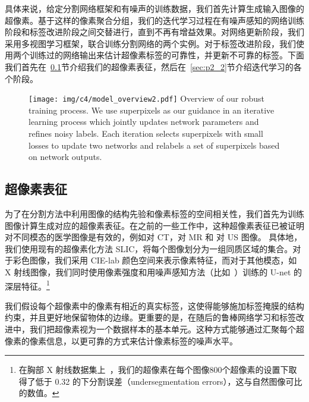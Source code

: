 具体来说，给定分割网络框架和有噪声的训练数据，我们首先计算生成输入图像的超像素。基于这样的像素聚合分组，我们的迭代学习过程在有噪声感知的网络训练阶段和标签改进阶段之间交替进行，直到不再有增益效果。对网络更新阶段，我们采用多视图学习框架，联合训练分割网络的两个实例。对于标签改进阶段，我们使用两个训练过的网络输出来估计超像素标签的可靠性，并更新不可靠的标签。下面我们首先在~\ref{sec:p2_1}节介绍我们的超像素表征，然后在~\ref{sec:p2_2}节介绍迭代学习的各个阶段。

    \begin{figure}[tbp]
        \centering 
        \texttt{[image: img/c4/model\_overview2.pdf]}
        {Overview of our robust training process. We use superpixels as our guidance in an iterative learning process which jointly updates network parameters and refines noisy labels. Each iteration selects superpixels with small losses to update two networks and relabels a set of superpixels based on network outputs.} %
        \label{fig:nss_overview}
    \end{figure}


\subsection{超像素表征} \label{sec:p2_1}

为了在分割方法中利用图像的结构先验和像素标签的空间相关性，我们首先为训练图像计算生成对应的超像素表征。在之前的一些工作中，这种超像素表征已被证明对不同模态的医学图像是有效的，例如\citet{qin2018superpixel}对 CT，\citet{tian2015superpixel}对 MR 和 \citet{daoud2019automatic}对 US 图像。
具体地，我们使用现有的超像素化方法 SLIC\citep{Achanta2012SLICSC}，将每个图像划分为一组同质区域的集合。对于彩色图像，我们采用 CIE-lab 颜色空间来表示像素特征，而对于其他模态，如 X 射线图像，我们同时使用像素强度和用噪声感知方法（比如~\citet{Wei2020CombatingNL}）训练的 U-net 的深层特征。\footnote{在胸部 X 射线数据集上~\cite{Shiraishi2000DevelopmentOA,Ginneken2006SegmentationOA}，我们的超像素在每个图像800个超像素的设置下取得了低于 0.32 的下分割误差（undersegmentation errors），这与自然图像可比的数值\citep{Achanta2012SLICSC}。}

我们假设每个超像素中的像素有相近的真实标签，这使得能够施加标签掩膜的结构约束，并且更好地保留物体的边缘。更重要的是，在随后的鲁棒网络学习和标签改进中，我们把超像素视为一个数据样本的基本单元。这种方式能够通过汇聚每个超像素的像素信息，以更可靠的方式来估计像素标签的噪声水平。

